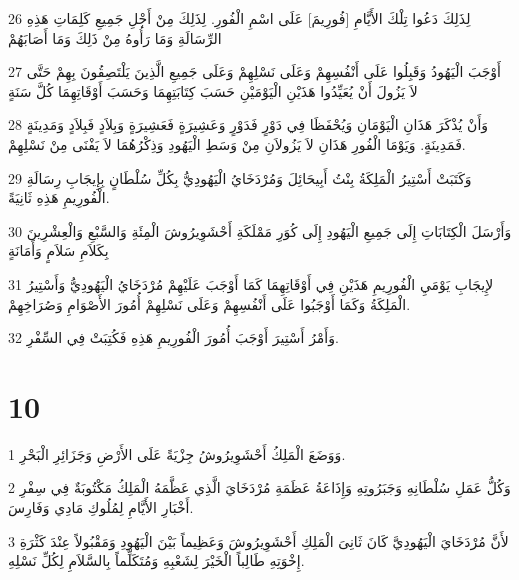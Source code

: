 \par 26 لِذَلِكَ دَعُوا تِلْكَ الأَيَّامِ [فُورِيمَ] عَلَى اسْمِ الْفُورِ. لِذَلِكَ مِنْ أَجْلِ جَمِيعِ كَلِمَاتِ هَذِهِ الرِّسَالَةِ وَمَا رَأُوهُ مِنْ ذَلِكَ وَمَا أَصَابَهُمْ
\par 27 أَوْجَبَ الْيَهُودُ وَقَبِلُوا عَلَى أَنْفُسِهِمْ وَعَلَى نَسْلِهِمْ وَعَلَى جَمِيعِ الَّذِينَ يَلْتَصِقُونَ بِهِمْ حَتَّى لاَ يَزُولَ أَنْ يُعَيِّدُوا هَذَيْنِ الْيَوْمَيْنِ حَسَبَ كِتَابَتِهِمَا وَحَسَبَ أَوْقَاتِهِمَا كُلَّ سَنَةٍ
\par 28 وَأَنْ يُذْكَرَ هَذَانِ الْيَوْمَانِ وَيُحْفَظَا فِي دَوْرٍ فَدَوْرٍ وَعَشِيرَةٍ فَعَشِيرَةٍ وَبِلاَدٍ فَبِلاَدٍ وَمَدِينَةٍ فَمَدِينَةٍ. وَيَوْمَا الْفُورِ هَذَانِ لاَ يَزُولاَنِ مِنْ وَسَطِ الْيَهُودِ وَذِكْرُهُمَا لاَ يَفْنَى مِنْ نَسْلِهِمْ.
\par 29 وَكَتَبَتْ أَسْتِيرُ الْمَلِكَةُ بِنْتُ أَبِيحَائِلَ وَمُرْدَخَايُ الْيَهُودِيُّ بِكُلِّ سُلْطَانٍ بِإِيجَابِ رِسَالَةِ الْفُورِيمِ هَذِهِ ثَانِيَةً.
\par 30 وَأَرْسَلَ الْكِتَابَاتِ إِلَى جَمِيعِ الْيَهُودِ إِلَى كُوَرِ مَمْلَكَةِ أَحْشَوِيرُوشَ الْمِئَةِ وَالسَّبْعِ وَالْعِشْرِينَ بِكَلاَمِ سَلاَمٍ وَأَمَانَةٍ
\par 31 لإِيجَابِ يَوْمَيِ الْفُورِيمِ هَذَيْنِ فِي أَوْقَاتِهِمَا كَمَا أَوْجَبَ عَلَيْهِمْ مُرْدَخَايُ الْيَهُودِيُّ وَأَسْتِيرُ الْمَلِكَةُ وَكَمَا أَوْجَبُوا عَلَى أَنْفُسِهِمْ وَعَلَى نَسْلِهِمْ أُمُورَ الأَصْوَامِ وَصُرَاخِهِمْ.
\par 32 وَأَمْرُ أَسْتِيرَ أَوْجَبَ أُمُورَ الْفُورِيمِ هَذِهِ فَكُتِبَتْ فِي السِّفْرِ.

\chapter{10}

\par 1 وَوَضَعَ الْمَلِكُ أَحْشَوِيرُوشُ جِزْيَةً عَلَى الأَرْضِ وَجَزَائِرِ الْبَحْرِ.
\par 2 وَكُلُّ عَمَلِ سُلْطَانِهِ وَجَبَرُوتِهِ وَإِذَاعَةُ عَظَمَةِ مُرْدَخَايَ الَّذِي عَظَّمَهُ الْمَلِكُ مَكْتُوبَةٌ فِي سِفْرِ أَخْبَارِ الأَيَّامِ لِمُلُوكِ مَادِي وَفَارِسَ.
\par 3 لأَنَّ مُرْدَخَايَ الْيَهُودِيَّ كَانَ ثَانِىَ الْمَلِكِ أَحْشَوِيرُوشَ وَعَظِيماً بَيْنَ الْيَهُودِ وَمَقْبُولاً عِنْدَ كَثْرَةِ إِخْوَتِهِ طَالِباً الْخَيْرَ لِشَعْبِهِ وَمُتَكَلِّماً بِالسَّلاَمِ لِكُلِّ نَسْلِهِ.

